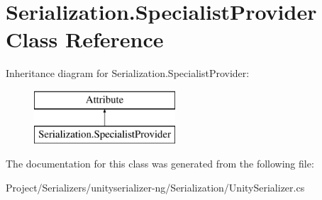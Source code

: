 \hypertarget{class_serialization_1_1_specialist_provider}{}\section{Serialization.\+Specialist\+Provider Class Reference}
\label{class_serialization_1_1_specialist_provider}
Inheritance diagram for Serialization.\+Specialist\+Provider\+:\begin{figure}[H]
\begin{center}
\leavevmode
\includegraphics[height=2.000000cm]{class_serialization_1_1_specialist_provider}
\end{center}
\end{figure}


The documentation for this class was generated from the following file\+:\begin{DoxyCompactItemize}
\item 
Project/\+Serializers/unityserializer-\/ng/\+Serialization/Unity\+Serializer.\+cs\end{DoxyCompactItemize}
